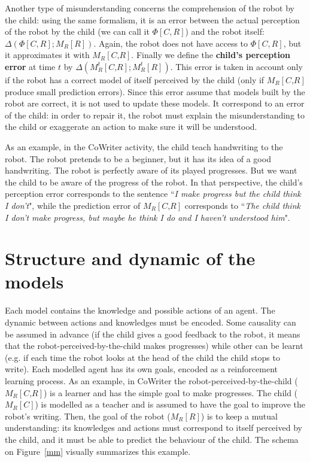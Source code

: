 \documentclass[conference]{IEEEtran}
\begin{document}
Another type of misunderstanding concerns the comprehension of the robot by the child: using the same formalism, it is an error between the actual perception of the robot by the child (we can call it $\Phi[C,R]$) and the robot itself: $\Delta \left(\Phi[C,R] ; M_R\left[\textit{R}\right]\right)$. Again, the robot does not have access to $\Phi[C,R]$, but it approximates it with $ M_R\left[\textit{C,R}\right]$. Finally we define the \textbf{child's perception error} at time $t$ by $\Delta \left(M^t_R\left[\textit{C,R}\right] ; M^t_R\left[\textit{R}\right]\right)$. This error is taken in account only if the robot has a correct model of itself perceived by the child (only if $M_R\left[\textit{C,R}\right]$ produce small prediction errors). Since this error assume that models built by the robot are correct, it is not used to update these models. It correspond to an error of the child: in order to repair it, the robot must explain the misunderstanding to the child or exaggerate an action to make sure it will be understood.

As an example, in the CoWriter activity, the child teach handwriting to the robot. The robot pretends to be a beginner, but it has its idea of a good handwriting. The robot is perfectly aware of its played progresses. But we want the child to be aware of the progress of the robot. In that perspective, the child's perception error corresponds to the sentence ``\textit{I make progress but the child think I don't}", while the prediction error of $M_R\left[\textit{C,R}\right]$ corresponds to ``\textit{The child think I don't make progress, but maybe he think I do and I haven't understood him}".  

\section{Structure and dynamic of the models}
Each model contains the knowledge and possible actions of an agent. The dynamic between actions and knowledges must be encoded. Some causality can be assumed in advance (if the child gives a good feedback to the robot, it means that the robot-perceived-by-the-child makes progresses) while other can be learnt (e.g. if each time the robot looks at the head of the child the child stops to write). Each modelled agent has its own goals, encoded as a reinforcement learning process. As an example, in CoWriter the robot-perceived-by-the-child ($ M_R\left[\textit{C,R}\right]$) is a learner and has the simple goal to make progresses. The child ($ M_R\left[\textit{C}\right]$) is modelled as a teacher and is assumed to have the goal to improve the robot's writing. Then, the goal of the robot ($ M_R\left[\textit{R}\right]$) is to keep a mutual understanding: its knowledges and actions must correspond to itself perceived by the child, and it must be able to predict the behaviour of the child. The schema on Figure~\ref{mm} visually summarizes this example.
\end{document}
